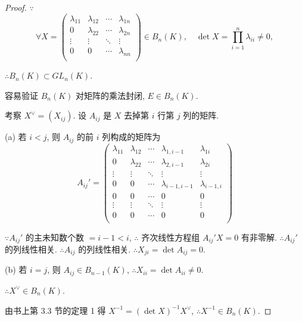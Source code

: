 \documentclass[color=black,device=normal,lang=cn,mode=geye]{elegantnote}
\begin{document}
\begin{proof}
    $\because$
    \[\forall X=\begin{pmatrix}
        \lambda_{11} & \lambda_{12} & \cdots & \lambda_{1n} \\
        0 & \lambda_{22} & \cdots & \lambda_{2n} \\
        \vdots & \vdots & \ddots & \vdots \\
        0 & 0 & \cdots & \lambda_{nn} \\
    \end{pmatrix}\in B_n(K),\quad\det X=\prod\limits_{i=1}^n\lambda_{ii}\neq0,\]

    $\therefore B_n(K)\subset GL _n(K)$.

    容易验证 $B_n(K)$ 对矩阵的乘法封闭, $E\in B_n(K)$.

    考察 $X^\vee=(X_{ij})$. 设 $A_{ij}$ 是 $X$ 去掉第 $i$ 行第 $j$ 列的矩阵.
    
    (a) 若 $i<j$, 则 $A_{ij}$ 的前 $i$ 列构成的矩阵为
    \[A_{ij}'=\begin{pmatrix}
        \lambda_{11} & \lambda_{12} & \cdots & \lambda_{1,i-1} & \lambda_{1i} \\
        0 & \lambda_{22} & \cdots & \lambda_{2,i-1} & \lambda_{2i} \\
        \vdots & \vdots & \ddots & \vdots & \vdots \\
        0 & 0 & \cdots & \lambda_{i-1,i-1} & \lambda_{i-1,i} \\
        0 & 0 & \cdots & 0 & 0 \\
        \vdots & \vdots & \ddots & \vdots & \vdots \\
        0 & 0 & \cdots & 0 & 0 \\
    \end{pmatrix}\]

    $\because A_{ij}'$ 的主未知数个数 $=i-1<i$, $\therefore$ 齐次线性方程组 $A_{ij}'X=0$ 有非零解. $\therefore A_{ij}'$ 的列线性相关. $\therefore A_{ij}$ 的列线性相关. $\therefore X_{ji}=\det A_{ij}=0$.

    (b) 若 $i=j$, 则 $A_{ij}\in B_{n-1}(K)$, $\therefore X_{ii}=\det A_{ii}\neq0$.
    
    $\therefore X^\vee\in B_n(K)$.

    由书上第 3.3 节的定理 1 得 $X^{-1}=(\det X)^{-1}X^\vee$, $\therefore X^{-1}\in B_n(K)$.
\end{proof}
\end{document}
